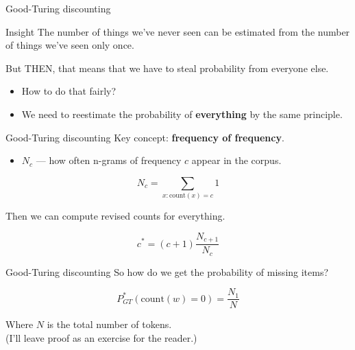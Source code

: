 \documentclass{beamer}
\begin{document}
\begin{frame}{Good-Turing discounting}
  \begin{block}{Insight}
    The number of things we've never seen can be estimated from the
    number of things we've seen only once.
  \end{block} \pause
  But THEN, that means that we have to steal probability from everyone
  else.  \pause
  \begin{itemize}
  \item How to do that fairly?\pause
  \item We need to reestimate the probability of \textbf{everything} 
    by the same principle.  
  \end{itemize}
\end{frame}

\begin{frame}{Good-Turing discounting}
  Key concept: \textbf{frequency of frequency}.
  \begin{itemize}
  \item $N_c$ --- how often n-grams of frequency $c$ appear in the corpus.
  \end{itemize}\pause

  \begin{block}

    \[N_c = \sum_{x:\mathrm{count}(x)=c} 1\]
  \end{block}\pause

  Then we can compute revised counts for everything.
  \begin{block}

    \[c^* = (c+1)\frac{N_{c+1}}{N_c}\]
  \end{block}
\end{frame}


\begin{frame}{Good-Turing discounting}
  So how do we get the probability of missing items?\pause
  \begin{block}

    \[P^*_{GT}(\mathrm{count}(w) = 0) = \frac{N_1}{N}\]
  \end{block}
  Where $N$ is the total number of tokens.\\
  (I'll leave proof as an exercise for the reader.)
\end{frame}
\end{document}
